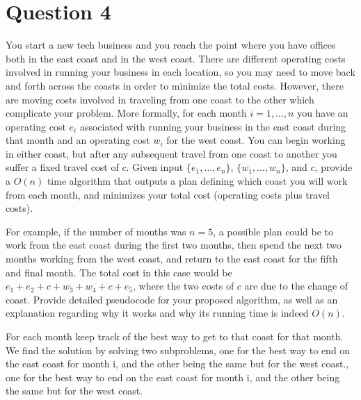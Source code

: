 \documentclass{article}
\begin{document}
\section*{Question 4}
You start a new tech business and you reach the point where you have offices both in the
east coast and in the west coast. There are different operating costs involved in running your business
in each location, so you may need to move back and forth across the coasts in order to minimize the total
costs. However, there are moving costs involved in traveling from one coast to the other which complicate
your problem. More formally, for each month $i=1,\dots, n$ you have an operating cost $e_i$ associated
with running your business in the east coast during that month and an operating cost $w_i$ for the west coast.
You can begin working in either coast, but after any subsequent travel from one coast to another you suffer
a fixed travel cost of $c$. Given input $\{e_1,\dots, e_n\}$, $\{w_1,\dots, w_n\}$, and $c$, provide a $O(n)$
time algorithm that outputs a plan defining which coast you will work from each month, and minimizes your
total cost (operating costs plus travel costs).

For example, if the number of months was $n=5$, a possible plan could be to work from the east coast during
the first two months, then spend the next two months working from the west coast, and return to the east coast
for the fifth and final month. The total cost in this case would be $e_1+e_2+c+ w_3+w_4+c +e_5$, where the
two costs of $c$ are due to the change of coast. Provide detailed pseudocode for your proposed algorithm, as
well as an explanation regarding why it works and why its running time is indeed $O(n)$.

For each month keep track of the best way to get to that coast for that month.
\\
We find the solution by solving two subproblems, one for the best way to end on the east coast for month i, and the other being the same but for the west coast., one for the best way to end on the east coast for month i, and the other being the same but for the west coast.
\end{document}
